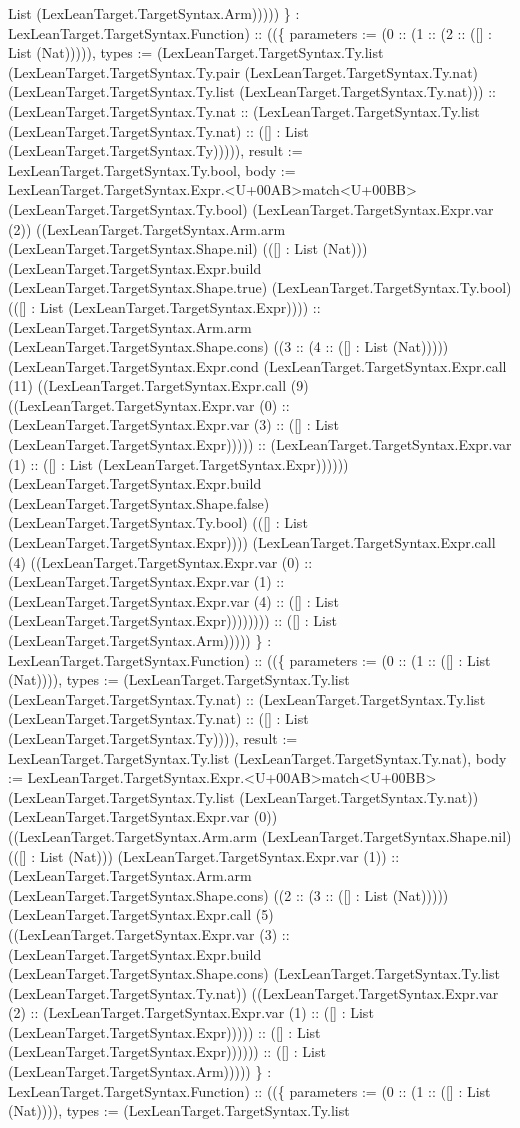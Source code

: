 \documentclass[11pt]{article}
\begin{document}
List (LexLeanTarget.TargetSyntax.Arm))))) \} : LexLeanTarget.TargetSyntax.Function) :: ((\{ parameters := (0 :: (1 :: (2 :: ([] : List (Nat))))), types := (LexLeanTarget.TargetSyntax.Ty.list (LexLeanTarget.TargetSyntax.Ty.pair (LexLeanTarget.TargetSyntax.Ty.nat) (LexLeanTarget.TargetSyntax.Ty.list (LexLeanTarget.TargetSyntax.Ty.nat))) :: (LexLeanTarget.TargetSyntax.Ty.nat :: (LexLeanTarget.TargetSyntax.Ty.list (LexLeanTarget.TargetSyntax.Ty.nat) :: ([] : List (LexLeanTarget.TargetSyntax.Ty))))), result := LexLeanTarget.TargetSyntax.Ty.bool, body := LexLeanTarget.TargetSyntax.Expr.<U+00AB>match<U+00BB> (LexLeanTarget.TargetSyntax.Ty.bool) (LexLeanTarget.TargetSyntax.Expr.var (2)) ((LexLeanTarget.TargetSyntax.Arm.arm (LexLeanTarget.TargetSyntax.Shape.nil) (([] : List (Nat))) (LexLeanTarget.TargetSyntax.Expr.build (LexLeanTarget.TargetSyntax.Shape.true) (LexLeanTarget.TargetSyntax.Ty.bool) (([] : List (LexLeanTarget.TargetSyntax.Expr)))) :: (LexLeanTarget.TargetSyntax.Arm.arm (LexLeanTarget.TargetSyntax.Shape.cons) ((3 :: (4 :: ([] : List (Nat))))) (LexLeanTarget.TargetSyntax.Expr.cond (LexLeanTarget.TargetSyntax.Expr.call (11) ((LexLeanTarget.TargetSyntax.Expr.call (9) ((LexLeanTarget.TargetSyntax.Expr.var (0) :: (LexLeanTarget.TargetSyntax.Expr.var (3) :: ([] : List (LexLeanTarget.TargetSyntax.Expr))))) :: (LexLeanTarget.TargetSyntax.Expr.var (1) :: ([] : List (LexLeanTarget.TargetSyntax.Expr)))))) (LexLeanTarget.TargetSyntax.Expr.build (LexLeanTarget.TargetSyntax.Shape.false) (LexLeanTarget.TargetSyntax.Ty.bool) (([] : List (LexLeanTarget.TargetSyntax.Expr)))) (LexLeanTarget.TargetSyntax.Expr.call (4) ((LexLeanTarget.TargetSyntax.Expr.var (0) :: (LexLeanTarget.TargetSyntax.Expr.var (1) :: (LexLeanTarget.TargetSyntax.Expr.var (4) :: ([] : List (LexLeanTarget.TargetSyntax.Expr)))))))) :: ([] : List (LexLeanTarget.TargetSyntax.Arm))))) \} : LexLeanTarget.TargetSyntax.Function) :: ((\{ parameters := (0 :: (1 :: ([] : List (Nat)))), types := (LexLeanTarget.TargetSyntax.Ty.list (LexLeanTarget.TargetSyntax.Ty.nat) :: (LexLeanTarget.TargetSyntax.Ty.list (LexLeanTarget.TargetSyntax.Ty.nat) :: ([] : List (LexLeanTarget.TargetSyntax.Ty)))), result := LexLeanTarget.TargetSyntax.Ty.list (LexLeanTarget.TargetSyntax.Ty.nat), body := LexLeanTarget.TargetSyntax.Expr.<U+00AB>match<U+00BB> (LexLeanTarget.TargetSyntax.Ty.list (LexLeanTarget.TargetSyntax.Ty.nat)) (LexLeanTarget.TargetSyntax.Expr.var (0)) ((LexLeanTarget.TargetSyntax.Arm.arm (LexLeanTarget.TargetSyntax.Shape.nil) (([] : List (Nat))) (LexLeanTarget.TargetSyntax.Expr.var (1)) :: (LexLeanTarget.TargetSyntax.Arm.arm (LexLeanTarget.TargetSyntax.Shape.cons) ((2 :: (3 :: ([] : List (Nat))))) (LexLeanTarget.TargetSyntax.Expr.call (5) ((LexLeanTarget.TargetSyntax.Expr.var (3) :: (LexLeanTarget.TargetSyntax.Expr.build (LexLeanTarget.TargetSyntax.Shape.cons) (LexLeanTarget.TargetSyntax.Ty.list (LexLeanTarget.TargetSyntax.Ty.nat)) ((LexLeanTarget.TargetSyntax.Expr.var (2) :: (LexLeanTarget.TargetSyntax.Expr.var (1) :: ([] : List (LexLeanTarget.TargetSyntax.Expr))))) :: ([] : List (LexLeanTarget.TargetSyntax.Expr)))))) :: ([] : List (LexLeanTarget.TargetSyntax.Arm))))) \} : LexLeanTarget.TargetSyntax.Function) :: ((\{ parameters := (0 :: (1 :: ([] : List (Nat)))), types := (LexLeanTarget.TargetSyntax.Ty.list 
\end{document}

